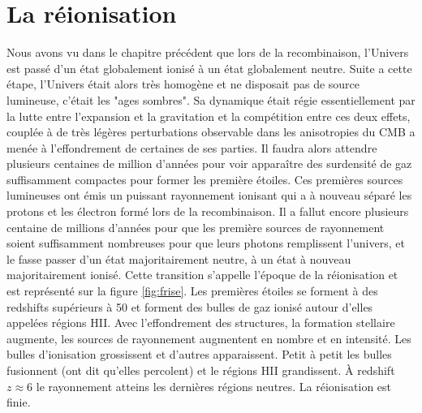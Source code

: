 
\chapter{La réionisation} 
\label{sec:introreio}

%
%
%
%



Nous avons vu dans le chapitre précédent que lors de la recombinaison, l'Univers est passé d'un état globalement ionisé à un état globalement neutre.
Suite a cette étape, l'Univers était alors très homogène et ne disposait pas de source lumineuse, c'était les "ages sombres".
Sa dynamique était régie essentiellement par la lutte entre l'expansion et la gravitation et la compétition entre ces deux effets, couplée à de très légères perturbations observable dans les anisotropies du \ac{CMB} a menée à l'effondrement de certaines de ses parties.
Il faudra alors attendre plusieurs centaines de million d'années pour voir apparaître des surdensité de gaz suffisamment compactes pour former les première étoiles.
Ces premières sources lumineuses ont émis un puissant rayonnement ionisant qui a à nouveau séparé les protons et les électron formé lors de la recombinaison.
Il a fallut encore plusieurs centaine de millions d'années pour que les première sources de rayonnement soient suffisamment nombreuses pour que leurs photons remplissent l'univers, et le fasse passer d'un état majoritairement neutre, à un état à nouveau majoritairement ionisé. 
Cette transition s'appelle l’époque de la réionisation et est représenté sur la figure \ref{fig:frise}.
Les premières étoiles se forment à des redshifts supérieurs à 50 et forment des bulles de gaz ionisé autour d'elles appelées régions HII.
Avec l’effondrement des structures, la formation stellaire augmente, les sources de rayonnement augmentent en nombre et en intensité.
Les bulles d'ionisation grossissent et d'autres apparaissent.
Petit à petit les bulles fusionnent (ont dit qu'elles percolent) et le régions HII grandissent.
À redshift $z\approx 6$ le rayonnement atteins les dernières régions neutres.
La réionisation est finie.

